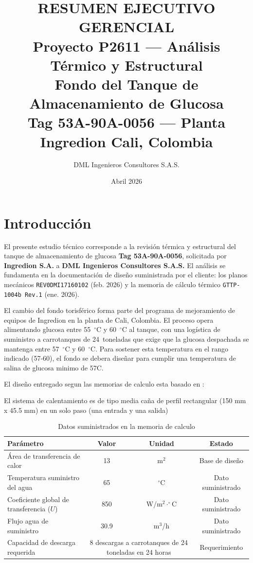 \documentclass[11pt,a4paper]{article}
\title{\vspace{-1cm}\textbf{\large RESUMEN EJECUTIVO GERENCIAL}\\[0.3cm]
\textbf{Proyecto P2611 --- Análisis Térmico y Estructural}\\
\textbf{Fondo del Tanque de Almacenamiento de Glucosa}\\[0.2cm]
\large Tag 53A-90A-0056 --- Planta Ingredion Cali, Colombia}
\author{DML Ingenieros Consultores S.A.S.}
\date{Abril 2026}
\begin{document}
\maketitle
\thispagestyle{fancy}
\vspace{-0.5cm}

\section{Introducción}

El presente estudio técnico corresponde a la revisión térmica y estructural del tanque de almacenamiento de glucosa \textbf{Tag 53A-90A-0056}, solicitada por \textbf{Ingredion S.A.} a \textbf{DML Ingenieros Consultores S.A.S.} El análisis se fundamenta en la documentación de diseño suministrada por el cliente: los planos mecánicos \texttt{REV0DMI17160102} (feb. 2026) y la memoria de cálculo térmico \texttt{GTTP-1004b Rev.1} (ene. 2026).

El cambio del fondo torisférico forma parte del programa de mejoramiento de equipos de Ingredion en la planta de Cali, Colombia. El proceso opera alimentando glucosa entre 55~$^\circ$C y 60~$^\circ$C al tanque, con una logística de suministro a carrotanques de 24~toneladas que exige que la glucosa despachada se mantenga entre 57~$^\circ$C y 60~$^\circ$C. Para sostener esta temperatura en el rango indicado (57-60), el fondo se debera diseñar para cumplir una temperatura de salina de glucosa minimo de 57C.

El diseño entregado segun las memorias de calculo esta basado en :

  El sistema de calentamiento es de tipo  media caña de perfil rectangular (150 mm x 45.5 mm) en un solo paso (una entrada y una salida)

\begin{table}[H]
\centering
\footnotesize
\caption{Datos suministrados en la memoria de calculo}
\label{tab:kpi}
\begin{tabular}{@{}lccc@{}}
\toprule
\textbf{Parámetro} & \textbf{Valor} & \textbf{Unidad} & \textbf{Estado} \\
\midrule
Área de transferencia de calor & 13 & m$^2$ & Base de diseño \\
Temperatura suministro del agua & 65 & $^\circ$C & Dato suministrado \\
Coeficiente global de transferencia ($U$) & 850 & W/m$^2\cdot^\circ$C & Dato suministrado \\
Flujo agua de suministro & 30.9 & m$^3$/h & Dato suministrado \\
Capacidad de descarga requerida & \multicolumn{2}{c}{8 descargas a carrotanques de 24 toneladas en 24 horas} & Requerimiento \\
\bottomrule
\end{tabular}
\end{table}
\end{document}
